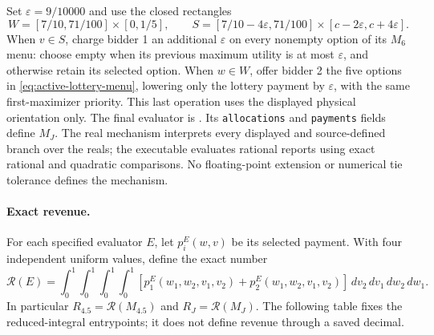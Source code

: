 Set $\varepsilon=9/10000$ and use the closed rectangles
\[
 W=[7/10,71/100]\times[0,1/5],\qquad
 S=[7/10-4\varepsilon,71/100]\times[c-2\varepsilon,c+4\varepsilon].
\]
When $v\in S$, charge bidder 1 an additional $\varepsilon$ on every
nonempty option of its $M_6$ menu: choose empty when its previous maximum
utility is at most $\varepsilon$, and otherwise retain its selected option.
When $w\in W$, offer bidder 2 the five options in
\eqref{eq:active-lottery-menu}, lowering only the lottery payment by
$\varepsilon$, with the same first-maximizer priority. This last operation
uses the displayed physical orientation only. The final evaluator is
.
Its \texttt{allocations} and \texttt{payments} fields define $M_J$.
The real mechanism interprets every displayed and source-defined branch
over the reals; the executable evaluates rational reports using exact
rational and quadratic comparisons. No floating-point extension or numerical
tie tolerance defines the mechanism.

\paragraph{Exact revenue.}
For each specified evaluator $E$, let $p_i^E(w,v)$ be its selected payment.
With four independent uniform values, define the exact number
\begin{equation}\label{eq:active-payment-integral}
 \mathcal R(E)=\int_0^1\!\int_0^1\!\int_0^1\!\int_0^1
 [p_1^E(w_1,w_2,v_1,v_2)+p_2^E(w_1,w_2,v_1,v_2)]
 \,dv_2\,dv_1\,dw_2\,dw_1.
\end{equation}
In particular $R_{4.5}=\mathcal R(M_{4.5})$ and
$R_J=\mathcal R(M_J)$. The following table fixes the reduced-integral
entrypoints; it does not define revenue through a saved decimal.

